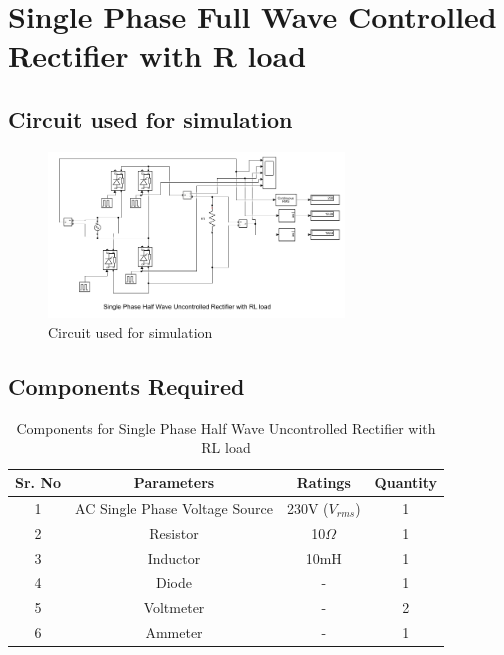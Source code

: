 \section{Single Phase Full Wave Controlled Rectifier with
  R load}

\subsection{Circuit used for simulation}

\begin{figure}[h]
    \centering
    \includegraphics[width=0.7\textwidth]{images/experiment-2/circuit-diagram-simulation-02.png}
    \caption{Circuit used for simulation}
    \label{Fig_simulation_circuit_single-phase-full-wave-controlled-rectifier-with-R-load}
\end{figure}

\subsection{Components Required}

\begin{table}[h]
    \renewcommand{\arraystretch}{1.3}
    \label{table_components_required_circuit_2}
    \centering
    \begin{tabular}{|c|c|c|c|}
        \hline
        Sr. No & Parameters                     & Ratings            & Quantity \\
        \hline
        \hline
        1      & AC Single Phase Voltage Source & 230V ($ V_{rms} $) & 1        \\
        \hline
        2      & Resistor                       & 10$ \Omega $       & 1        \\
        \hline
        3      & Inductor                       & 10mH               & 1        \\
        \hline
        4      & Diode                          & -                  & 1        \\
        \hline
        5      & Voltmeter                      & -                  & 2        \\
        \hline
        6      & Ammeter                        & -                  & 1        \\
        \hline
    \end{tabular}
    \caption{Components for Single Phase Half Wave Uncontrolled Rectifier with RL load}
\end{table}


